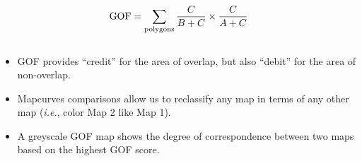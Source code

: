 \begin{frame}
\begin{columns}[c]
\begin{column}[c]{0.66\textwidth}
\begin{center}
    \begin{align*}
     \textnormal{GOF} = \sum\limits_\textnormal{polygons} \frac{C}{B + C} \times \frac{C}{A + C}
    \end{align*}
   \end{center}
  \end{column}
 \end{columns}
 \begin{itemize}\small
  \item GOF provides ``credit'' for the area of overlap, but also ``debit'' for the area of non-overlap.
  \item Mapcurves comparisons allow us to reclassify any map in terms of any other map (\textit{i.e.}, color Map 2 like Map 1).
  \item A greyscale GOF map shows the degree of correspondence between two maps based on the highest GOF score.
 \end{itemize}
\end{frame}

